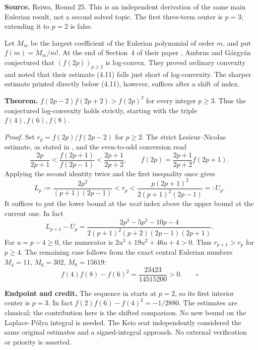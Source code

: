 \documentclass[11pt,a4paper]{article}
\begin{document}
\label{section:R25R}

\noindent\textbf{Source.} Reiwa, Round 25. This is an independent derivation of the same main Eulerian result, not a second solved topic. The first three-term center is $p=3$; extending it to $p=2$ is false.



\begingroup

\setcounter{equation}{0}
\renewcommand{\theequation}{\thesection.\arabic{equation}}
\renewcommand{\theHequation}{R25R.\arabic{equation}}
Let $M_m$ be the largest coefficient of the Eulerian polynomial of order $m$, and
put $f(m)=M_m/m!$. At the end of Section~4 of their paper \cite{R25K:AG}, Ambrus and
G\'argy\'an conjectured that $(f(2p))_{p\ge2}$ is log-convex. They proved
ordinary convexity and noted that their estimate (4.11) falls just short of
log-convexity. The sharper estimate printed directly below (4.11), however,
suffices after a shift of index.

\textbf{Theorem.} $f(2p-2)f(2p+2)>f(2p)^2$ for every integer $p\ge3$.
Thus the conjectured log-convexity holds strictly, starting with the triple
$f(4),f(6),f(8)$.

\textit{Proof.} Set $r_p=f(2p)/f(2p-2)$ for $p\ge2$. The strict Lesieur--Nicolas
estimate, as stated in \cite[Theorem~4.2]{R25K:AG}, and the even-to-odd conversion
\cite[equation~(4.10)]{R25K:AG} read
\[
 \frac{2p}{2p+1}<\frac{f(2p+1)}{f(2p-1)}<\frac{2p+1}{2p+2},
 \qquad f(2p)=\frac{2p+1}{2p+2}f(2p+1).
\]
Applying the second identity twice and the first inequality once gives
\[
 L_p:=\frac{2p^2}{(p+1)(2p-1)}<r_p<
 \frac{p(2p+1)^2}{2(p+1)^2(2p-1)}=:U_p.
\]
It suffices to put the lower bound at the \emph{next} index above the upper
bound at the current one. In fact
\[
 L_{p+1}-U_p=
 \frac{2p^3-5p^2-10p-4}{2(p+1)^2(p+2)(2p-1)(2p+1)}.
\]
For $u=p-4\ge0$, the numerator is $2u^3+19u^2+46u+4>0$.
Thus $r_{p+1}>r_p$ for $p\ge4$.
The remaining case follows from the exact central Eulerian numbers
$M_4=11$, $M_6=302$, $M_8=15619$:
\[
 f(4)f(8)-f(6)^2=\frac{23423}{14515200}>0.\qquad\square
\]

\textbf{Endpoint and credit.} The sequence in \cite{R25K:AG} starts at $p=2$, so its
first interior center is $p=3$. In fact $f(2)f(6)-f(4)^2=-1/2880$.
The estimates are classical; the contribution here is the shifted
comparison. No new bound on the Laplace--P\'olya integral is needed.
The Keio seat independently considered the same original estimates and a
signed-integral approach. No external verification or priority is asserted.
\endgroup
\end{document}

